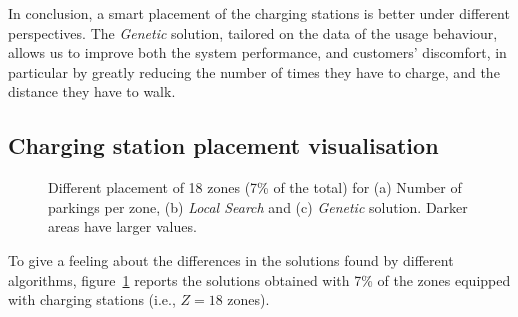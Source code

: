 In conclusion, a smart placement of the charging stations is better under different perspectives.  The \textit{Genetic} solution, tailored on the data of the usage behaviour, allows us to improve both the system performance, and customers' discomfort, in particular by greatly reducing the number of times they have to charge, and the distance they have to walk.


\subsection{Charging station placement visualisation}

\begin{figure}[h!]
    \centering     %
    \caption{Different placement of 18 zones (7\% of the total) for (a) Number of parkings per zone, (b) \textit{Local Search}  and (c) \textit{Genetic} solution. Darker areas have larger values.}
    \label{fig:7_7a_maps}
\end{figure}

To give a feeling about the differences in the solutions found by different algorithms, figure~\ref{fig:7_7a_maps} reports the solutions obtained with 7\% of the zones equipped with charging stations (i.e., $Z=18$ zones).   

